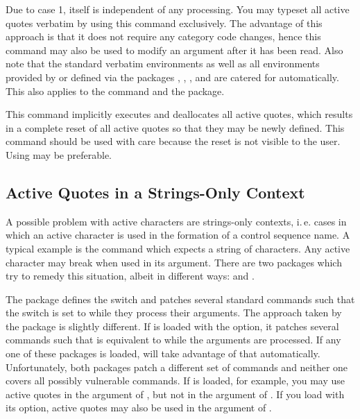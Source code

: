 \documentclass{ltxdockit}[2010/09/26]
\begin{document}
\begin{ltxsyntax}
Due to case 1,  itself is independent of any  processing. You may typeset all active quotes verbatim by using this command exclusively. The advantage of this approach is that it does not require any category code changes, hence this command may also be used to modify an argument after it has been read. Also note that the standard \latex verbatim environments as well as all environments provided by or defined via the packages , , , and  are catered for automatically. This also applies to the  command and the  package.


This command implicitly executes  and deallocates all active quotes, which results in a complete reset of all active quotes so that they may be newly defined. This command should be used with care because the reset is not visible to the user. Using  may be preferable.

\end{ltxsyntax}

\subsection{Active Quotes in a Strings-Only Context}
\label{aut:str}

A possible problem with active characters are strings-only contexts, i.\,e. cases in which an active character is used in the formation of a control sequence name. A typical example is the  command which expects a string of characters. Any active character may break  when used in its argument. There are two packages which try to remedy this situation, albeit in different ways:  and .

The  package defines the switch  and patches several standard commands such that the switch is set to  while they process their arguments. The approach taken by the  package is slightly different. If  is loaded with the  option, it patches several commands such that  is equivalent to  while the arguments are processed. If any one of these packages is loaded,  will take advantage of that automatically. Unfortunately, both packages patch a different set of commands and neither one covers all possibly vulnerable commands. If  is loaded, for example, you may use active quotes in the argument of , but not in the argument of . If you load  with its  option, active quotes may also be used in the argument of .
\end{document}

